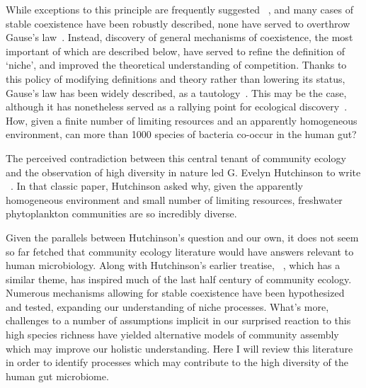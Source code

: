 \documentclass[12pt]{article}
\begin{document}
While exceptions to this principle are frequently suggested%
~\citep{Koch1974a,Koch1974b},
and many cases of stable coexistence have been robustly described,
none have served to overthrow Gause's law~\citep{Hutchinson1957}.
Instead, discovery of general mechanisms of coexistence, the
most important of which are described below, have served
to refine the definition of `niche', and improved the theoretical
understanding of competition.
Thanks to this policy of modifying definitions and theory
rather than lowering its status, Gause's law has been widely described,
as a tautology~\citep{Hutchinson1961,Slobodkin1961}.
This may be the case, although it has nonetheless served as a
rallying point for ecological discovery~\citep{Armstrong1980}.
How, given a finite number of limiting resources and an apparently
homogeneous environment, can more than 1000 species of bacteria
co-occur in the human gut?

The perceived contradiction between this central tenant
of community ecology
and the observation of high diversity in nature led
G. Evelyn Hutchinson to write
~\citeyearpar{Hutchinson1961}.
In that classic paper, Hutchinson asked why,
given the apparently homogeneous environment
and small number of limiting resources,
freshwater phytoplankton communities are so incredibly diverse.

Given the parallels between Hutchinson's question and our own,
it does not seem so far fetched that community ecology literature would have
answers relevant to human microbiology.
Along with Hutchinson's earlier treatise,
~\citeyearpar{Hutchinson1959},
which has a similar theme,
 has inspired much of the
last half century of community ecology.
Numerous mechanisms allowing for stable coexistence have been
hypothesized and tested, expanding our understanding of niche
processes.
What's more, challenges to a number of assumptions implicit in our
surprised reaction to this high species richness
have yielded alternative models of community assembly
which may improve our holistic understanding.
Here I will review this literature in order to identify processes which may
contribute to the high diversity of the human gut microbiome.
\end{document}
